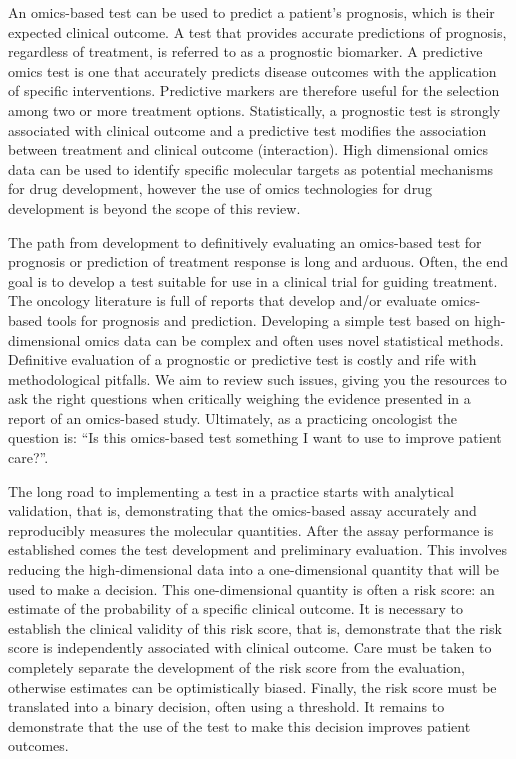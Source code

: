 \documentclass[11pt]{article}
\begin{document}
An omics-based test can be used to predict a patient's prognosis, which
is their expected clinical outcome. A test that provides accurate
predictions of prognosis, regardless of treatment, is referred to as a
prognostic biomarker. A predictive omics test is one that accurately
predicts disease outcomes with the application of specific
interventions. Predictive markers are therefore useful for the selection
among two or more treatment options. Statistically, a prognostic test is
strongly associated with clinical outcome and a predictive test modifies
the association between treatment and clinical outcome (interaction).
High dimensional omics data can be used to identify specific molecular
targets as potential mechanisms for drug development, however the use of
omics technologies for drug development is beyond the scope of this
review.

The path from development to definitively evaluating an omics-based test
for prognosis or prediction of treatment response is long and arduous.
Often, the end goal is to develop a test suitable for use in a clinical
trial for guiding treatment. The oncology literature is full of reports
that develop and/or evaluate omics-based tools for prognosis and
prediction. Developing a simple test based on high-dimensional omics
data can be complex and often uses novel statistical methods. Definitive
evaluation of a prognostic or predictive test is costly and rife with
methodological pitfalls. We aim to review such issues, giving you the
resources to ask the right questions when critically weighing the
evidence presented in a report of an omics-based study. Ultimately, as a
practicing oncologist the question is: ``Is this omics-based test
something I want to use to improve patient care?''.

The long road to implementing a test in a practice starts with
analytical validation, that is, demonstrating that the omics-based assay
accurately and reproducibly measures the molecular quantities. After the
assay performance is established comes the test development and
preliminary evaluation. This involves reducing the high-dimensional data
into a one-dimensional quantity that will be used to make a decision.
This one-dimensional quantity is often a risk score: an estimate of the
probability of a specific clinical outcome. It is necessary to establish
the clinical validity of this risk score, that is, demonstrate that the
risk score is independently associated with clinical outcome. Care must
be taken to completely separate the development of the risk score from
the evaluation, otherwise estimates can be optimistically biased.
Finally, the risk score must be translated into a binary decision, often
using a threshold. It remains to demonstrate that the use of the test to
make this decision improves patient outcomes.
\end{document}
